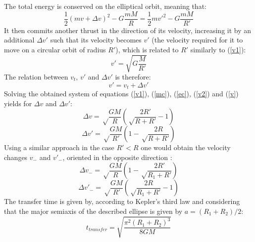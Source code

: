 \documentclass[onecolumn,12pt]{article}
\numberwithin{equation}{section}
\begin{document}
The total energy is conserved on the elliptical orbit, meaning that:
\begin{equation}
    \frac{1}{2}(mv+\Delta v)^2 - G \frac{mM}{R} = \frac{1}{2}mv'^2 - G \frac{mM}{R'}
    \label{ec}
\end{equation}
It then commits another thrust in the direction of its velocity, increasing it by an additional $\Delta v'$ such that its velocity becomes $v'$ (the velocity required for it to move on a circular orbit of radius $R'$), which is related to $R'$ similarly to (\ref{v1}):
\begin{equation}
    v' = \sqrt{G\frac{M}{R'}}
    \label{v2}
\end{equation}
The relation between $v_t$, $v'$ and $\Delta v'$ is therefore:
\begin{equation}
    v' = v_t + \Delta v'
    \label{v}
\end{equation}
Solving the obtained system of equations (\ref{v1}), (\ref{mc}), (\ref{ec}), (\ref{v2}) and (\ref{v}) yields for $\Delta v$ and $\Delta v'$:
\begin{equation}
    \Delta v = \sqrt\frac{GM}{R}\left( \sqrt\frac{2R'}{R+R'}-1\right)
    \label{theory1}
\end{equation}
\begin{equation}
    \Delta v' = \sqrt\frac{GM}{R'}\left( 1-\sqrt\frac{2R}{R+R'}\right) 
\end{equation}
Using a similar approach in the case $R'<R$ one would obtain the velocity changes $v_-$ and $v'_-$, oriented in the opposite direction :
\begin{equation}
    \Delta v_- = \sqrt\frac{GM}{R}\left(1 - \sqrt\frac{2R'}{R_1+R'}\right) 
    \label{hohmanntransfer}
\end{equation}
\begin{equation}
    \Delta v'_- = \sqrt\frac{GM}{R'}\left(\sqrt\frac{2R}{R_1+R'}-1\right) 
\end{equation}
The transfer time is given by, according to Kepler's third law and considering that the major semiaxis of the described ellipse is given by $a = (R_1+R_2)/2$:
\begin{equation}
    t_{transfer} = \sqrt{\frac{\pi^2(R_1+R_2)^3}{8GM}}
    \label{time}
\end{equation}
\end{document}
